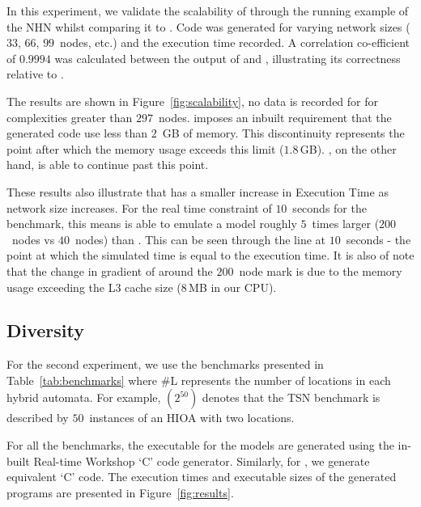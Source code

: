 In this experiment, we  validate the scalability of
\ourTool through the running example of the \ac{NHN} whilst comparing it
to \simulink.  Code was generated for varying network sizes ($33$,
$66$, $99$~nodes, etc.) and the execution time recorded.  A correlation 
co-efficient of $0.9994$ was 
calculated between the output of \ourTool and \simulink, illustrating its 
correctness relative to \simulink.

The results are shown in Figure~\ref{fig:scalability}, 
no data is recorded for \simulink for
complexities greater than $297$~nodes.  \simulink imposes an inbuilt
requirement that the generated code use less than $2$~GB of memory. This
discontinuity represents the point after which the memory usage exceeds
this limit ($1.8$\,GB).
\ourTool, on the other hand, is able to continue past this
point.

These results also illustrate that \ourTool has a smaller increase in
Execution Time as network size increases. For the real time constraint of 
$10$~seconds for the benchmark, this means \ourTool is able to emulate a model 
roughly $5$~times larger ($200$~nodes vs $40$~nodes) than \simulink.  This 
can be seen through the line at $10$~seconds - the point at which the simulated 
time is equal to the execution time.  It is also of note that the change in 
gradient of \ourTool around the $200$~node mark is due to the memory usage 
exceeding the L$3$ cache size ($8$\,MB in our CPU).


\subsection{Diversity}
\label{sec:diversity}



For the second experiment, we use the  benchmarks
presented in Table~\ref{tab:benchmarks} where  
\#L represents the number of locations in each hybrid automata.  For example,
$(2^{50})$ denotes that the \acf{TSN} benchmark is described by $50$~instances 
of an \ac{HIOA} with two locations.

For all the benchmarks, the executable for the \simulink models are
generated using the in-built Real-time
Workshop\textsuperscript{\textregistered} `C' code generator.  Similarly,
for \ourTool, we generate equivalent `C' code.
The execution times and executable sizes of the generated programs are  
presented  in Figure~\ref{fig:results}.

